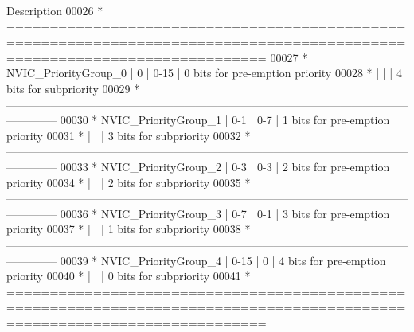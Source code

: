 \begin{DoxyCode}
{        Description}
00026 \textcolor{comment}{  *   
       ==========================================================================================================================}
00027 \textcolor{comment}{  *     NVIC\_PriorityGroup\_0  |                0                  |            0-15             | 0
       bits for pre-emption priority}
00028 \textcolor{comment}{  *                           |                                   |                             | 4
       bits for subpriority}
00029 \textcolor{comment}{  *   
       --------------------------------------------------------------------------------------------------------------------------}
00030 \textcolor{comment}{  *     NVIC\_PriorityGroup\_1  |                0-1                |            0-7              | 1
       bits for pre-emption priority}
00031 \textcolor{comment}{  *                           |                                   |                             | 3
       bits for subpriority}
00032 \textcolor{comment}{  *   
       --------------------------------------------------------------------------------------------------------------------------    }
00033 \textcolor{comment}{  *     NVIC\_PriorityGroup\_2  |                0-3                |            0-3              | 2
       bits for pre-emption priority}
00034 \textcolor{comment}{  *                           |                                   |                             | 2
       bits for subpriority}
00035 \textcolor{comment}{  *   
       --------------------------------------------------------------------------------------------------------------------------    }
00036 \textcolor{comment}{  *     NVIC\_PriorityGroup\_3  |                0-7                |            0-1              | 3
       bits for pre-emption priority}
00037 \textcolor{comment}{  *                           |                                   |                             | 1
       bits for subpriority}
00038 \textcolor{comment}{  *   
       --------------------------------------------------------------------------------------------------------------------------    }
00039 \textcolor{comment}{  *     NVIC\_PriorityGroup\_4  |                0-15               |            0                | 4
       bits for pre-emption priority}
00040 \textcolor{comment}{  *                           |                                   |                             | 0
       bits for subpriority                       }
00041 \textcolor{comment}{  *   
       ==========================================================================================================================     }

\end{DoxyCode}

